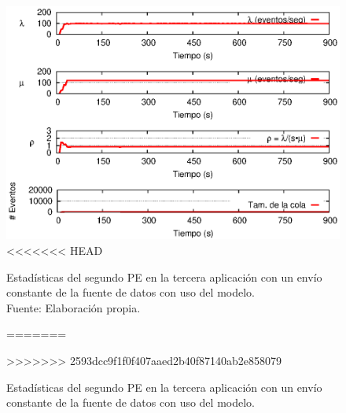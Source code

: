 \begin{figure}[!htp]
    \centering
    \captionsetup{justification=centering}
	\includegraphics[scale=1]{images/exp/app3/cm/logical/statusTwoPE.eps}
<<<<<<< HEAD
    \caption[Estadísticas del segundo PE en la tercera aplicación con un envío constante de la fuente de datos con uso del modelo.]{Estadísticas del segundo PE en la tercera aplicación con un envío constante de la fuente de datos con uso del modelo.\\Fuente: Elaboración propia.}
=======
    \caption{Estad\'isticas del segundo PE en la tercera aplicaci\'on con un env\'io constante de la fuente de datos con uso del modelo.}
>>>>>>> 2593dcc9f1f0f407aaed2b40f87140ab2e858079
    \label{fig:app3-statusTwoPE-cm}
\end{figure}


